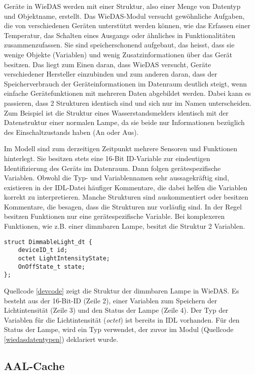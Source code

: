 Geräte in WieDAS werden mit einer Struktur, also einer Menge von Datentyp und Objektname,
erstellt.
Das WieDAS-Modul versucht gewöhnliche Aufgaben, die von verschiedenen Geräten unterstützt werden
können, wie das Erfassen einer Temperatur, das Schalten eines Ausgangs oder ähnliches in
Funktionalitäten zusammenzufassen.
Sie sind speicherschonend aufgebaut, das heisst, dass sie wenige Objekte (Variablen) und wenig
Zusatzinformationen über das Gerät besitzen.
Das liegt zum Einen daran, dass WieDAS versucht, Geräte verschiedener Hersteller einzubinden und zum
anderen daran, dass der Speicherverbrauch der Geräteinformationen im Datenraum deutlich steigt,
wenn einfache Gerätefunktionen mit mehreren Daten abgebildet werden.
Dabei kann es passieren, dass 2 Strukturen identisch sind und sich nur im Namen unterscheiden.
Zum Beispiel ist die Struktur eines Wasserstandsmelders identisch mit der Datenstruktur einer
normalen Lampe, da sie beide nur Informationen bezüglich des Einschaltzustands haben (An oder Aus).

Im Modell sind zum derzeitigen Zeitpunkt mehrere Sensoren und Funktionen hinterlegt.
Sie besitzen stets eine 16-Bit ID-Variable zur eindeutigen Identifizierung des Geräts im Datenraum.
Dann folgen gerätespezifische Variablen.
Obwohl die Typ- und Variablennamen sehr aussagekräftig sind, existieren in der IDL-Datei
häufiger Kommentare, die dabei helfen die Variablen korrekt zu interpretieren.
Manche Strukturen sind auskommentiert oder besitzen Kommentare, die besagen, dass die Strukturen
nur vorläufig sind.
In der Regel besitzen Funktionen nur eine gerätespezifische Variable.
Bei komplexeren Funktionen, wie z.B. einer dimmbaren Lampe, besitzt die Struktur 2 Variablen.

\lstset{language=IDL}
\begin{lstlisting}[frame=single,caption={Gerätebeschreibung eines dimmbaren Lichts in WieDAS},label={devcode}]
struct DimmableLight_dt {
	deviceID_t id;
	octet LightIntensityState;
	OnOffState_t state;
};
\end{lstlisting}
Quellcode \ref{devcode} zeigt die Struktur der dimmbaren Lampe in WieDAS.
Es besteht aus der 16-Bit-ID (Zeile 2), einer Variablen zum Speichern der Lichtintensität (Zeile 3) und den Status
der Lampe (Zeile 4).
Der Typ der Variablen für die Lichtintensität (\emph{octet}) ist bereits in IDL vorhanden.
Für den Status der Lampe, wird ein Typ verwendet, der zuvor im Modul (Quellcode \ref{wiedasdatentypen}) deklariert wurde.

\subsection{AAL-Cache}
\label{gru_aalcache}

